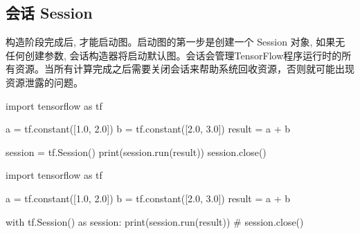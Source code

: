 \subsection{会话 Session}
\begin{frame}[fragile]{\insertsection}{\insertsubsection}
构造阶段完成后, 才能启动图。启动图的第一步是创建一个 Session 对象, 如果无任何创建参数, 会话构造器将启动默认图。会话会管理TensorFlow程序运行时的所有资源。当所有计算完成之后需要关闭会话来帮助系统回收资源，否则就可能出现资源泄露的问题。

\begin{minipage}[t]{0.48\textwidth}
\begin{pythoncode}
import tensorflow as tf

a = tf.constant([1.0, 2.0])
b = tf.constant([2.0, 3.0])
result = a + b

session = tf.Session()
print(session.run(result))
session.close()
\end{pythoncode}
\end{minipage}%
\hfill%
\begin{minipage}[t]{0.48\textwidth}
\begin{pythoncode}
import tensorflow as tf

a = tf.constant([1.0, 2.0])
b = tf.constant([2.0, 3.0])
result = a + b

with tf.Session() as session:
    print(session.run(result))
# session.close()
\end{pythoncode}
\end{minipage}
\end{frame}